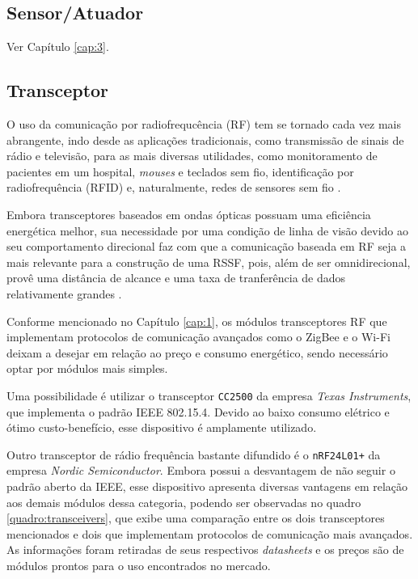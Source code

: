 \subsection{Sensor/Atuador}
Ver Capítulo \ref{cap:3}.

\subsection{Transceptor}
O uso da comunicação por radiofrequcência (RF) tem se tornado cada vez mais abrangente, indo desde as
aplicações tradicionais, como transmissão de sinais de rádio e televisão, para as mais diversas utilidades,
como monitoramento de pacientes em um hospital, \textit{mouses} e teclados sem fio, identificação por
radiofrequência (RFID) e, naturalmente, redes de sensores sem fio \cite{misra2001}.

Embora transceptores baseados em ondas ópticas possuam uma eficiência energética melhor, sua necessidade por
uma condição de linha de visão devido ao seu comportamento direcional faz com que a comunicação baseada em RF
seja a mais relevante para a construção de uma RSSF, pois, além de ser omnidirecional, provê uma distância de
alcance e uma taxa de tranferência de dados relativamente grandes \cite{kuorilehto2007,karl_willig2005}.

Conforme mencionado no Capítulo \ref{cap:1}, os módulos transceptores RF que implementam protocolos de
comunicação avançados como o ZigBee e o Wi-Fi deixam a desejar em relação ao preço e consumo energético,
sendo necessário optar por módulos mais simples.

Uma possibilidade é utilizar o transceptor \texttt{CC2500} da empresa \textit{Texas Instruments}, que
implementa o padrão IEEE 802.15.4. Devido ao baixo consumo elétrico e ótimo custo-benefício, esse dispositivo
é amplamente utilizado.

Outro transceptor de rádio frequência bastante difundido é o \texttt{nRF24L01+} da empresa \textit{Nordic
Semiconductor}. Embora possui a desvantagem de não seguir o padrão aberto da IEEE, esse dispositivo apresenta
diversas vantagens em relação aos demais módulos dessa categoria, podendo ser observadas no quadro
\ref{quadro:transceivers}, que exibe uma comparação entre os dois transceptores mencionados e dois que
implementam protocolos de comunicação mais avançados. As informações foram retiradas de seus respectivos
\textit{datasheets} e os preços são de módulos prontos para o uso encontrados no mercado.

